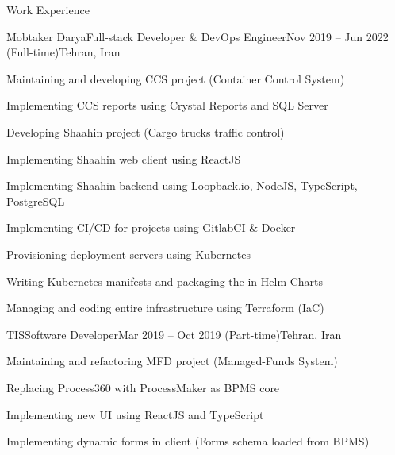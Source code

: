 \documentclass[]{main}
\begin{document}
\begin{section}{Work Experience}
 \begin{subsection}{Mobtaker Darya}{Full-stack Developer \& DevOps Engineer}{Nov 2019 -- Jun 2022 (Full-time)}{Tehran, Iran}
     \item Maintaining and developing CCS project (Container Control System)
     \item Implementing CCS reports using Crystal Reports and SQL Server
     \item Developing Shaahin project (Cargo trucks traffic control)
     \item Implementing Shaahin web client using ReactJS
     \item Implementing Shaahin backend using Loopback.io, NodeJS, TypeScript, PostgreSQL
     \item Implementing CI/CD for projects using GitlabCI \& Docker
     \item Provisioning deployment servers using Kubernetes
     \item Writing Kubernetes manifests and packaging the in Helm Charts
     \item Managing and coding entire infrastructure using Terraform (IaC)
 \end{subsection}
 \begin{subsection}{TIS}{Software Developer}{Mar 2019 -- Oct 2019 (Part-time)}{Tehran, Iran}
     \item Maintaining and refactoring MFD project (Managed-Funds System)
     \item Replacing Process360 with ProcessMaker as BPMS core
     \item Implementing new UI using ReactJS and TypeScript
     \item Implementing dynamic forms in client (Forms schema loaded from BPMS)
 \end{subsection}
\end{section}

\end{document}
